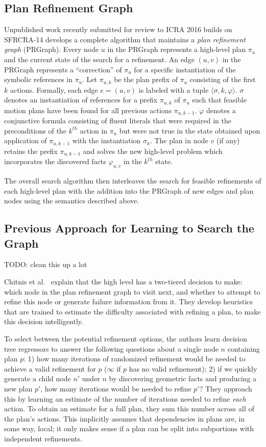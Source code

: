 \subsection{Plan Refinement Graph}
Unpublished work recently submitted for review to ICRA 2016 builds on SFRCRA-14 develops a complete algorithm
that maintains a \emph{plan refinement graph} (PRGraph). Every node $u$ in the PRGraph
represents a high-level plan $\pi_u$ and the current state of the search
for a refinement. An edge $(u,v)$ in the PRGraph
represents a ``correction'' of $\pi_u$ for a specific instantiation of
the symbolic references in $\pi_u$. Let $\pi_{u,k}$ be the plan prefix of
$\pi_u$ consisting of the first $k$ actions. Formally, each edge
$e=(u,v)$ is labeled with a tuple $\langle \sigma, k, \varphi \rangle$.
$\sigma$ denotes an instantiation of references for a prefix $\pi_{u,k}$ of
$\pi_u$ such that feasible motion plans have been found for all
previous actions $\pi_{u,k-1}$. $\varphi$ denotes a conjunctive formula
consisting of fluent literals
that were required in the preconditions of the $k^{th}$ action in
$\pi_u$ but were not true in the state obtained upon
application of $\pi_{u,k-1}$ with the instantiation $\sigma_k$.  The
plan in node $v$ (if any) retains the prefix $\pi_{u,k-1}$ and solves
the new high-level problem which incorporates the discovered facts $\varphi_{u,v}$
in the $k^{th}$ state.

The overall search algorithm then interleaves the search for feasible
refinements of each high-level plan with the addition into the
PRGraph of new edges and plan nodes using the semantics described above.

\subsection{Previous Approach for Learning to Search the Graph}
TODO: clean this up a lot

Chitnis et al.~\cite{chitnis2015mlpc} explain that the high level has a two-tiered
decision to make: which node in the plan refinement graph to
visit next, and whether to attempt to refine this node or generate failure information
from it. They develop heuristics that are trained to estimate
the difficulty associated with refining a plan, to make this decision intelligently.

To select between the potential refinement options, the authors learn decision tree regressors
to answer the following questions about a single node $n$ containing plan $p$: 1) how many iterations of randomized refinement
would be needed to achieve a valid refinement for $p$ ($\infty$ if $p$ has no valid refinement); 2)
if we quickly generate a child node $n'$ under $n$ by discovering geometric facts and producing a new plan $p'$,
how many iterations would be needed to refine $p'$? They approach this by learning an estimate of the
number of iterations needed to refine \emph{each} action. To obtain an estimate for a full plan, they
sum this number across all of the plan's actions. This implicitly assumes that dependencies in plans are, in some way, local;
it only makes sense if a plan can be split into subportions with independent refinements.

